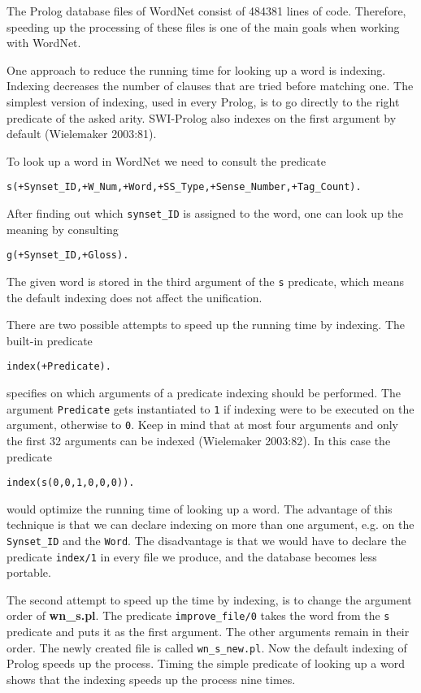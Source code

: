 \documentclass[12pt]{article}
\begin{document}
The Prolog database files of WordNet consist of 484381 lines of code. Therefore, speeding up the processing of these files is
one of the main goals when working with WordNet.

One approach to reduce the running time for looking up a word is indexing. Indexing decreases the number of clauses
that are tried before matching one. The simplest version of indexing, used in every Prolog,
is to go directly to the right predicate of the asked arity. SWI-Prolog also indexes on the first argument by default (Wielemaker 2003:81).

To look up a word in WordNet we need to consult the predicate
\begin{verbatim}
s(+Synset_ID,+W_Num,+Word,+SS_Type,+Sense_Number,+Tag_Count).
\end{verbatim}
After finding out which {\tt synset\_ID} is assigned to the word, one can look up the meaning by consulting
\begin{verbatim}
g(+Synset_ID,+Gloss).
\end{verbatim}
The given word is stored in the third argument of the {\tt s} predicate, which means the default indexing does not affect the unification.

There are two possible attempts to speed up the running time by indexing. The built-in predicate
\begin{verbatim}
index(+Predicate).
\end{verbatim}
specifies on which
arguments of a predicate indexing should be performed.
The argument {\tt Predicate} gets instantiated to {\tt 1} if indexing were to be executed on the argument, otherwise to
{\tt 0}. Keep in mind that at most four arguments and only the first 32 arguments can be indexed (Wielemaker 2003:82).
In this case the predicate
\begin{verbatim}
index(s(0,0,1,0,0,0)).
\end{verbatim}
would optimize the running time of looking up a word.
The advantage of this technique is that we can declare indexing on more than one argument,
e.g. on the {\tt Synset\_ID} and the {\tt Word}.
The disadvantage is that we would have to declare the predicate {\tt index/1} in every file we produce,
and the database becomes less portable.

The second attempt to speed up the time by indexing, is to change the argument order
of {\bfseries wn\_s.pl}. The predicate {\tt improve\_file/0} takes the word from the {\tt s} predicate and
puts it as the first argument. The other arguments remain in their order.
The newly created file is called {\tt wn\_s\_new.pl}. Now the default indexing of Prolog speeds up the process.
Timing the simple predicate of looking up a word shows that
the indexing speeds up the process nine times.
\end{document}
